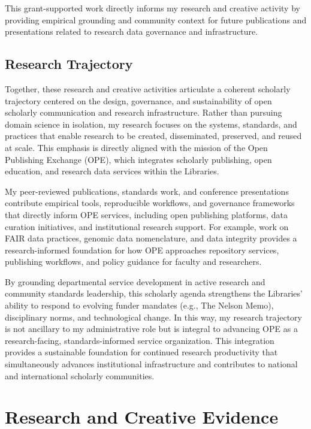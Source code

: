 This grant-supported work directly informs my research and creative activity by providing empirical grounding and community context for future publications and presentations related to research data governance and infrastructure.

\subsection*{Research Trajectory}

Together, these research and creative activities articulate a coherent scholarly trajectory centered on the design, governance, and sustainability of open scholarly communication and research infrastructure. Rather than pursuing domain science in isolation, my research focuses on the systems, standards, and practices that enable research to be created, disseminated, preserved, and reused at scale. This emphasis is directly aligned with the mission of the Open Publishing Exchange (OPE), which integrates scholarly publishing, open education, and research data services within the Libraries.

My peer-reviewed publications, standards work, and conference presentations contribute empirical tools, reproducible workflows, and governance frameworks that directly inform OPE services, including open publishing platforms, data curation initiatives, and institutional research support. For example, work on FAIR data practices, genomic data nomenclature, and data integrity provides a research-informed foundation for how OPE approaches repository services, publishing workflows, and policy guidance for faculty and researchers.

By grounding departmental service development in active research and community standards leadership, this scholarly agenda strengthens the Libraries’ ability to respond to evolving funder mandates (e.g., The Nelson Memo), disciplinary norms, and technological change. In this way, my research trajectory is not ancillary to my administrative role but is integral to advancing OPE as a research-facing, standards-informed service organization. This integration provides a sustainable foundation for continued research productivity that simultaneously advances institutional infrastructure and contributes to national and international scholarly communities.


\section{Research and Creative Evidence}
\printbibliography[keyword={creative},heading=none]
